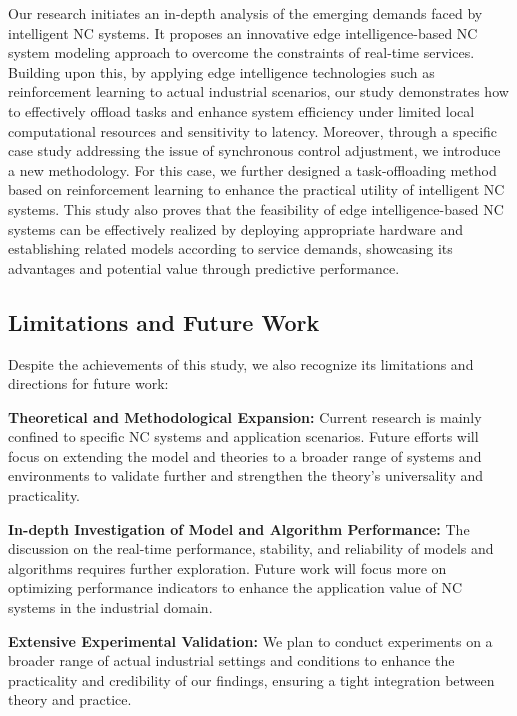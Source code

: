 \documentclass[preprint,12pt,authoryear]{elsarticle}
\begin{document}
Our research initiates an in-depth analysis of the emerging demands faced by intelligent NC systems. It proposes an innovative edge intelligence-based NC system modeling approach to overcome the constraints of real-time services. Building upon this, by applying edge intelligence technologies such as reinforcement learning to actual industrial scenarios, our study demonstrates how to effectively offload tasks and enhance system efficiency under limited local computational resources and sensitivity to latency. Moreover, through a specific case study addressing the issue of synchronous control adjustment, we introduce a new methodology. For this case, we further designed a task-offloading method based on reinforcement learning to enhance the practical utility of intelligent NC systems. This study also proves that the feasibility of edge intelligence-based NC systems can be effectively realized by deploying appropriate hardware and establishing related models according to service demands, showcasing its advantages and potential value through predictive performance.

\subsection{Limitations and Future Work}

Despite the achievements of this study, we also recognize its limitations and directions for future work:

\textbf{Theoretical and Methodological Expansion:} Current research is mainly confined to specific NC systems and application scenarios. Future efforts will focus on extending the model and theories to a broader range of systems and environments to validate further and strengthen the theory's universality and practicality.

\textbf{In-depth Investigation of Model and Algorithm Performance:} The discussion on the real-time performance, stability, and reliability of models and algorithms requires further exploration. Future work will focus more on optimizing performance indicators to enhance the application value of NC systems in the industrial domain.

\textbf{Extensive Experimental Validation:} We plan to conduct experiments on a broader range of actual industrial settings and conditions to enhance the practicality and credibility of our findings, ensuring a tight integration between theory and practice.

\end{document}
